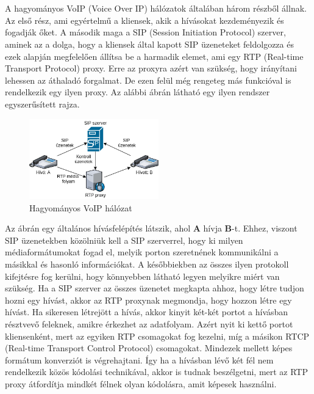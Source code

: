 \chapter{\bevezetes}
A hagyományos VoIP (Voice Over IP) hálózatok általában három részből állnak.
Az első rész, ami egyértelmű a kliensek, akik a hívásokat kezdeményezik és 
fogadják őket. A második maga a SIP (Session Initiation Protocol) szerver, aminek
az a dolga, hogy a kliensek által kapott SIP üzeneteket feldolgozza és ezek alapján
megfelelően állítsa be a harmadik elemet, ami egy RTP (Real-time Transport Protocol) 
proxy. Erre az proxyra azért van szükség, hogy irányítani lehessen az áthaladó 
forgalmat. De ezen felül még rengeteg más funkcióval is rendelkezik egy ilyen
proxy. Az alábbi ábrán látható egy ilyen rendszer egyszerűsített rajza.

\begin{figure}[!ht]
	\centering
	\includegraphics[width=0.5\textwidth, keepaspectratio]{figures/traditional_voip.png}
	\caption{Hagyományos VoIP hálózat}
	\label{fig:HVSpaces}
\end{figure}

Az ábrán egy általános hívásfelépítés látszik, ahol \textbf{A} hívja \textbf{B}-t. 
Ehhez, viszont SIP üzenetekben közölniük kell a SIP szerverrel, hogy ki milyen 
médiaformátumokat fogad el, melyik porton szeretnének kommunikálni a másikkal és 
hasonló információkat. A későbbiekben az összes ilyen protokoll kifejtésre fog
kerülni, hogy könnyebben látható legyen melyikre miért van szükség. Ha a SIP szerver
az összes üzenetet megkapta ahhoz, hogy létre tudjon hozni egy hívást, akkor az 
RTP proxynak megmondja, hogy hozzon létre egy hívást. Ha sikeresen létrejött a 
hívás, akkor kinyit két-két portot a hívásban résztvevő feleknek, amikre érkezhet
az adatfolyam. Azért nyit ki kettő portot kliensenként, mert az egyiken RTP 
csomagokat fog kezelni, míg a másikon RTCP (Real-time Transport Control Protocol) 
csomagokat. Mindezek mellett képes formátum konverziót is végrehajtani. Így ha 
a hívásban lévő két fél nem rendelkezik közös kódolási technikával, akkor is tudnak 
beszélgetni, mert az RTP proxy átfordítja mindkét félnek olyan kódolásra, amit 
képesek használni.

